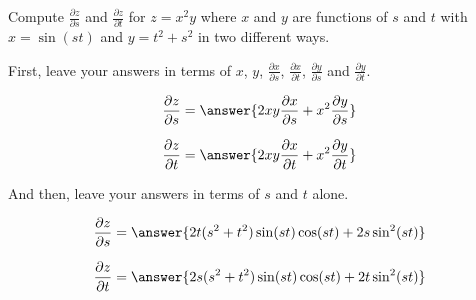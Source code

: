 \documentclass{ximera}
\author{David Guichard \and Neal Koblitz \and H. Jerome Keisler \and Albert Scheller \and Barry Balof \and Mike Wills \and Matthew Carr}
\begin{document}
\begin{exercise}




Compute $\frac{\partial z}{\partial s}$ and $\frac{\partial z}{\partial t}$ for $z=x^2 y$ where $x$ and $y$ are functions of $s$ and $t$ with $x=\sin(st)$ and $y=t^2+s^2$ in two different ways.

First, leave your answers in terms of $x$, $y$, $\frac{\partial x}{\partial s}$, $\frac{\partial x}{\partial t}$, $\frac{\partial y}{\partial s}$ and $\frac{\partial y}{\partial t}$.

\begin{prompt}
\[
\frac{\partial z}{\partial s}=\answer{2xy\frac{\partial x}{\partial s}+x^2 \frac{\partial y}{\partial s}}
\]
\end{prompt}
\begin{prompt}
\[
\frac{\partial z}{\partial t}=\answer{2xy\frac{\partial x}{\partial t}+x^2 \frac{\partial y}{\partial t}}
\]
\end{prompt}


And then, leave your answers in terms of $s$ and $t$ alone.

\begin{prompt}
\[
\frac{\partial z}{\partial s}=\answer{2t(s^2+t^2) \sin(st)\cos(st)+2s\sin^2(st)}
\]
\end{prompt}

\begin{prompt}
\[
\frac{\partial z}{\partial t}=\answer{2s(s^2+t^2)\sin(st)\cos(st)+2t\sin^2(st)}
\]
\end{prompt}


\end{exercise}
\end{document}
